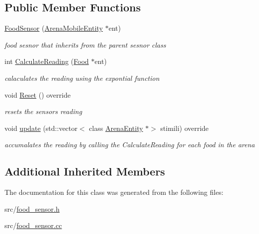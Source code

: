 \subsection*{Public Member Functions}
\begin{DoxyCompactItemize}
\item 
\mbox{\label{class_food_sensor_a69a35d7061b547ef3140aa03d889b749}} 
\mbox{\hyperlink{class_food_sensor_a69a35d7061b547ef3140aa03d889b749}{Food\+Sensor}} (\mbox{\hyperlink{class_arena_mobile_entity}{Arena\+Mobile\+Entity}} $\ast$ent)
\begin{DoxyCompactList}\small\item\em food sesnor that inherits from the parent sesnor class \end{DoxyCompactList}\item 
\mbox{\label{class_food_sensor_a76e0a85b68b3fb3983d25c43673f37b7}} 
int \mbox{\hyperlink{class_food_sensor_a76e0a85b68b3fb3983d25c43673f37b7}{Calculate\+Reading}} (\mbox{\hyperlink{class_food}{Food}} $\ast$ent)
\begin{DoxyCompactList}\small\item\em calaculates the reading using the expontial function \end{DoxyCompactList}\item 
\mbox{\label{class_food_sensor_a1b60ca32e66f68f2ca7ddd1d6d709764}} 
void \mbox{\hyperlink{class_food_sensor_a1b60ca32e66f68f2ca7ddd1d6d709764}{Reset}} () override
\begin{DoxyCompactList}\small\item\em resets the sensors reading \end{DoxyCompactList}\item 
\mbox{\label{class_food_sensor_a06e24339037730b4aea6d37cf15cf0b9}} 
void \mbox{\hyperlink{class_food_sensor_a06e24339037730b4aea6d37cf15cf0b9}{update}} (std\+::vector$<$ class \mbox{\hyperlink{class_arena_entity}{Arena\+Entity}} $\ast$$>$ stimili) override
\begin{DoxyCompactList}\small\item\em accumalates the reading by calling the Calculate\+Reading for each food in the arena \end{DoxyCompactList}\end{DoxyCompactItemize}
\subsection*{Additional Inherited Members}


The documentation for this class was generated from the following files\+:\begin{DoxyCompactItemize}
\item 
src/\mbox{\hyperlink{food__sensor_8h}{food\+\_\+sensor.\+h}}\item 
src/\mbox{\hyperlink{food__sensor_8cc}{food\+\_\+sensor.\+cc}}\end{DoxyCompactItemize}
